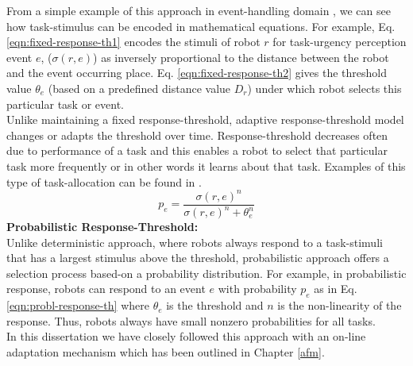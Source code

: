 From a simple example of this approach in event-handling domain \cite{kalra+2007},  we can see how task-stimulus can be encoded in mathematical equations. For example, Eq. \ref{eqn:fixed-response-th1} encodes the stimuli of robot $r$ for task-urgency perception event $e$, ($\sigma (r,e)$)  as inversely proportional to the distance between the robot and the event occurring place. Eq. \ref{eqn:fixed-response-th2} gives the threshold value $\theta_{e}$ (based on a predefined distance value $D_{r}$) under which robot selects this particular task or event. \\
Unlike maintaining a fixed response-threshold, adaptive response-threshold model  changes or adapts the threshold over time. Response-threshold decreases often due to performance of a task and this enables a robot  to select that particular task more frequently or in other words it learns about that task. Examples of this type of task-allocation can be found in . \\
\begin{equation}
\label{eqn:probl-response-th}
p_{e} = \frac{\sigma (r,e)^n}{\sigma (r,e)^n + \theta_{e}^n}
\end{equation}
\textbf{Probabilistic Response-Threshold:}\\
Unlike deterministic approach, where robots always respond to a task-stimuli that has a largest stimulus above the threshold,  probabilistic approach offers a selection process based-on a probability distribution. For example, in probabilistic response, robots can respond to an event $e$ with probability $p_{e}$ as in Eq. \ref{eqn:probl-response-th} where $\theta_{e}$ is the threshold and $n$ is the non-linearity of the response. Thus, robots  always have small nonzero probabilities  for all tasks.\\
In this dissertation we have closely followed this approach with an on-line adaptation mechanism which has been outlined in Chapter \ref{afm}.                                                                                                                                                                                                                                                                                                                                                                                                                                                                                                                                                                                                                                                                                                                            
